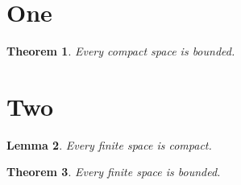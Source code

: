 \documentclass[prd]{revtex4}
\newtheorem{Thm}{Theorem}[section]
\newtheorem{Lem}[Thm]{Lemma}
\begin{document}
\section{One}
\begin{Thm} Every compact space is bounded. \end{Thm}
\section{Two}
\begin{Lem} Every finite space is compact. \end{Lem}
\begin{Thm} Every finite space is bounded. \end{Thm}
\end{document}
